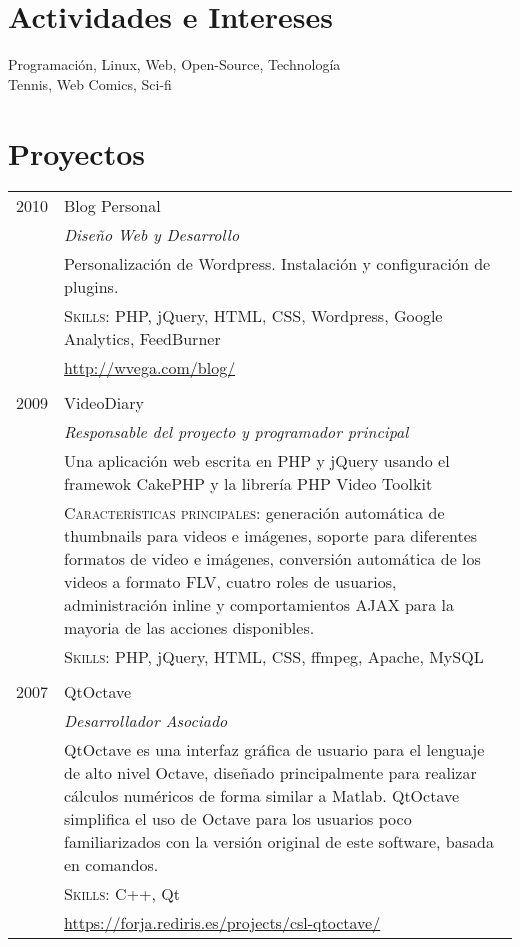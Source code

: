 \documentclass[letter,10pt]{article}
\begin{document}
\section{Actividades e Intereses}
Programación, Linux, Web, Open-Source, Technología\\
Tennis, Web Comics, Sci-fi\\

\newpage

\section{Proyectos}
\begin{tabular}{r|p{13cm}}
 \textsc{2010} & Blog Personal\\
 & \emph{Diseño Web y Desarrollo}\\
 & \footnotesize{Personalización de Wordpress. Instalación y configuración de plugins.}\\
 & \textsc{Skills:} PHP, jQuery, HTML, CSS, Wordpress, Google Analytics, FeedBurner\\
 & \href{http://wvega.com/blog/}{http://wvega.com/blog/}\\\multicolumn{2}{c}{} \\

 \textsc{2009} & VideoDiary\\
 & \emph{Responsable del proyecto y programador principal}\\
 & \footnotesize{Una aplicación web escrita en PHP y jQuery usando el framewok CakePHP y la librería PHP Video Toolkit}\\
 & \textsc{Características principales:} \footnotesize{generación automática de thumbnails para videos e imágenes, soporte para diferentes formatos de video e imágenes, conversión automática de los videos a formato FLV, cuatro roles de usuarios, administración inline y comportamientos AJAX para la mayoria de las acciones disponibles.}\\
 & \textsc{Skills:} PHP, jQuery, HTML, CSS, ffmpeg, Apache, MySQL\\\multicolumn{2}{c}{} \\

 \textsc{2007} & QtOctave\\
 & \emph{Desarrollador Asociado}\\
 & \footnotesize{QtOctave es una interfaz gráfica de usuario para el lenguaje de alto nivel Octave, diseñado principalmente para realizar cálculos numéricos de forma similar a Matlab. QtOctave simplifica el uso de Octave para los usuarios poco familiarizados con la versión original de este software, basada en comandos.}\\
 & \textsc{Skills:} C++, Qt\\
 & \href{https://forja.rediris.es/projects/csl-qtoctave/}{https://forja.rediris.es/projects/csl-qtoctave/}%
\end{tabular}
\end{document}

